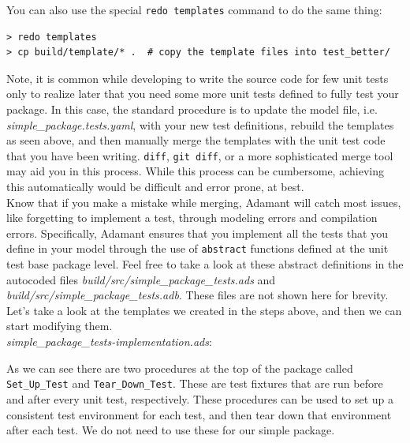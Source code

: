 You can also use the special \texttt{redo templates} command to do the same thing:

\vspace{5mm} %
\begin{verbatim}
> redo templates
> cp build/template/* .  # copy the template files into test_better/
\end{verbatim}
\vspace{5mm} %

Note, it is common while developing to write the source code for few unit tests only to realize later that you need some more unit tests defined to fully test your package. In this case, the standard procedure is to update the model file, i.e. \textit{simple\_package.tests.yaml}, with your new test definitions, rebuild the templates as seen above, and then manually merge the templates with the unit test code that you have been writing. \texttt{diff}, \texttt{git diff}, or a more sophisticated merge tool may aid you in this process. While this process can be cumbersome, achieving this automatically would be difficult and error prone, at best. \\

Know that if you make a mistake while merging, Adamant will catch most issues, like forgetting to implement a test, through modeling errors and compilation errors. Specifically, Adamant ensures that you implement all the tests that you define in your model through the use of \texttt{abstract} functions defined at the unit test base package level. Feel free to take a look at these abstract definitions in the autocoded files \textit{build/src/simple\_package\_tests.ads} and \textit{build/src/simple\_package\_tests.adb}. These files are not shown here for brevity. \\

Let's take a look at the templates we created in the steps above, and then we can start modifying them. \\

\textit{simple\_package\_tests-implementation.ads}:


As we can see there are two procedures at the top of the package called \texttt{Set\_Up\_Test} and \texttt{Tear\_Down\_Test}. These are test fixtures that are run before and after every unit test, respectively. These procedures can be used to set up a consistent test environment for each test, and then tear down that environment after each test. We do not need to use these for our simple package. \\

